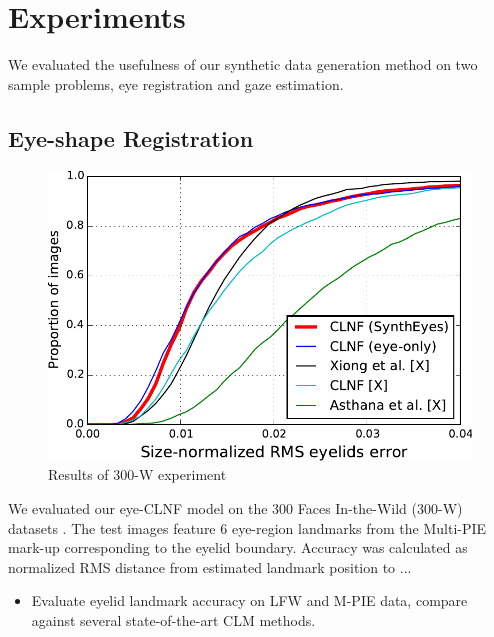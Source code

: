 
\section{Experiments}

% 

We evaluated the usefulness of our synthetic data generation method on two sample problems, eye registration and gaze estimation.


\subsection{Eye-shape Registration}

\begin{figure}
    \centering
    \includegraphics[width=0.7\columnwidth]{figs/CLNF_300W_experiment.pdf}
    \caption{Results of 300-W experiment}
    \label{fig:clnf_results}
\end{figure}



We evaluated our eye-CLNF model on the 300 Faces In-the-Wild (300-W) datasets \cite{sagonas2013300}. The test images feature 6 eye-region landmarks from the Multi-PIE \cite{gross2010multi} mark-up corresponding to the eyelid boundary. Accuracy was calculated as normalized RMS distance from estimated landmark position to ...

\begin{itemize}
    \item Evaluate eyelid landmark accuracy on LFW and M-PIE data, compare against several state-of-the-art CLM methods.
\end{itemize}

